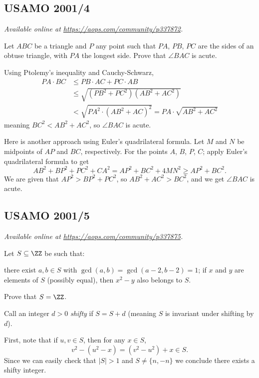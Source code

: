 \documentclass[11pt]{scrartcl}
\begin{document}
\subsection{USAMO 2001/4}
\textsl{Available online at \url{https://aops.com/community/p337872}.}
\begin{mdframed}[style=mdpurplebox,frametitle={Problem statement}]
Let $ABC$ be a triangle and $P$ any point
such that $PA$, $PB$, $PC$ are the sides of an obtuse triangle,
with $PA$ the longest side.
Prove that $\angle BAC$ is acute.
\end{mdframed}
Using Ptolemy's inequality and Cauchy-Schwarz,
\begin{align*}
  PA \cdot BC
  &\le PB \cdot AC + PC \cdot AB \\
  &\le \sqrt{(PB^2+PC^2)(AB^2+AC^2)} \\
  &< \sqrt{PA^2 \cdot (AB^2+AC)^2} = PA \cdot \sqrt{AB^2+AC^2}
\end{align*}
meaning $BC^2 < AB^2+AC^2$, so $\angle BAC$ is acute.

\begin{remark*}
  [Lokman G\"{o}k\c{c}e]
  Here is another approach using Euler's quadrilateral formula.
  Let $M$ and $N$ be midpoints of $AP$ and $BC$, respectively.
  For the points $A$, $B$, $P$, $C$; apply Euler's quadrilateral formula to get
  \[ AB^2 + BP^2 + PC^2 + CA^2 = AP^2 + BC^2 + 4MN^2 \geq AP^2 + BC^2. \]
  We are given that $AP^2 > BP^2 + PC^2$, so $AB^2 + AC^2 > BC^2$,
  and we get $\angle BAC$ is acute.
\end{remark*}
\pagebreak

\subsection{USAMO 2001/5}
\textsl{Available online at \url{https://aops.com/community/p337875}.}
\begin{mdframed}[style=mdpurplebox,frametitle={Problem statement}]
Let $S \subseteq \ZZ$ be such that:
\begin{enumerate}
  \ii[(a)] there exist $a,b \in S$ with
  $\gcd(a,b) = \gcd(a-2, b-2) = 1$;
  \ii[(b)] if $x$ and $y$ are elements of $S$ (possibly equal),
  then $x^2-y$ also belongs to $S$.
\end{enumerate}
Prove that $S = \ZZ$.
\end{mdframed}
Call an integer $d > 0$ \emph{shifty} if
$S = S+d$ (meaning $S$ is invariant under shifting by $d$).

First, note that if $u, v \in S$, then for any $x \in S$,
\[ v^2 - (u^2-x) = (v^2-u^2) + x \in S. \]
Since we can easily check that $|S| > 1$
and $S \neq \{n, -n\}$ we conclude there exists a shifty integer.
\end{document}
